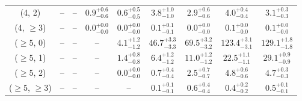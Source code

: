 \begin{table}[h!]
{\begin{tabular}{ccccccccc}
	(4, 2) & -- & -- & $0.9^{+ 0.6 }_{- 0.6 }$ & $0.6^{+ 0.5 }_{- 0.5 }$ & $3.8^{+ 1.0 }_{- 1.0 }$ & $2.9^{+ 0.6 }_{- 0.6 }$ & $4.0^{+ 0.4 }_{- 0.4 }$ & $3.1^{+ 0.3 }_{- 0.3 }$ \\[0.5ex] 
	(4, $\ge3$) & -- & -- & $0.0^{+ 0.0 }_{- 0.0 }$ & $0.0^{+ 0.0 }_{- 0.0 }$ & $0.1^{+ 0.1 }_{- 0.1 }$ & $0.0^{+ 0.0 }_{- 0.0 }$ & $0.1^{+ 0.0 }_{- 0.0 }$ & $0.1^{+ 0.0 }_{- 0.0 }$ \\[0.5ex] 
	($\ge5$, 0) & -- & -- & -- & $4.1^{+ 1.2 }_{- 1.2 }$ & $46.7^{+ 3.3 }_{- 3.3 }$ & $69.5^{+ 3.2 }_{- 3.2 }$ & $123.4^{+ 3.1 }_{- 3.1 }$ & $129.1^{+ 1.8 }_{- 1.8 }$ \\[0.5ex] 
	($\ge5$, 1) & -- & -- & -- & $1.4^{+ 0.8 }_{- 0.8 }$ & $6.4^{+ 1.2 }_{- 1.2 }$ & $11.0^{+ 1.2 }_{- 1.2 }$ & $22.5^{+ 1.1 }_{- 1.1 }$ & $29.1^{+ 0.9 }_{- 0.9 }$ \\[0.5ex] 
	($\ge5$, 2) & -- & -- & -- & $0.0^{+ 0.0 }_{- 0.0 }$ & $0.7^{+ 0.4 }_{- 0.4 }$ & $2.5^{+ 0.7 }_{- 0.7 }$ & $4.8^{+ 0.6 }_{- 0.6 }$ & $4.7^{+ 0.3 }_{- 0.3 }$ \\[0.5ex] 
	($\ge5$, $\ge3$) & -- & -- & -- & -- & $0.1^{+ 0.1 }_{- 0.1 }$ & $0.6^{+ 0.4 }_{- 0.4 }$ & $0.4^{+ 0.2 }_{- 0.2 }$ & $0.5^{+ 0.1 }_{- 0.1 }$ \\[0.5ex] 
	\hline
	\hline
\end{tabular}}
\end{table}
